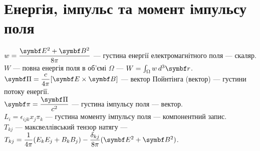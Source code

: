 \documentclass[%
biblatex,
]{ConspectBook}
\begin{document}
\section*{Енергія, імпульс та момент імпульсу поля}

  $w = \dfrac{\Efield^2+\Bfield^2}{8\pi}$ ---  густина енергії електромагнітного поля ---  скаляр.\\
  $W$ ---  повна енергія поля в об'ємі $\Omega$ ---  $W = \int_\Omega w\,d^3\vect{r}$.\\
  $\vect{\Pi} = \dfrac{c}{4\pi}[\Efield\times\Bfield]$ ---  вектор Пойнтінга (вектор) ---  густини потоку енергії.\\
  $\vect{\pi} = \dfrac{\vect{\Pi}}{c^2}$ ---  густина імпульсу поля ---  вектор.\\
  $L_i = \epsilon_{ijk}x_j\pi_k$ ---  густина моменту імпульсу поля ---  компонентний запис.\\
  $T_{kj}$ ---  максвеллівський тензор натягу ---
  $T_{kj}=\dfrac{1}{4\pi}\!\left(E_kE_j+B_kB_j\right)-\dfrac{\delta_{kj}}{8\pi}(\Efield^2+\Bfield^2)$.\\
\end{document}
